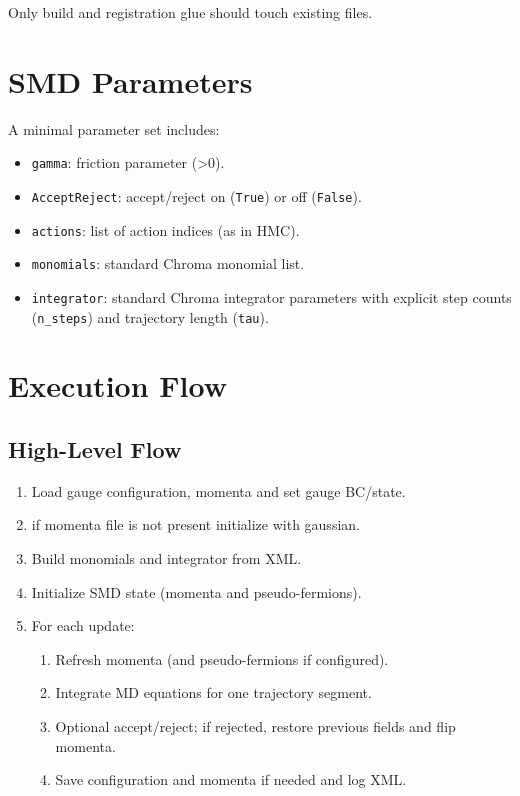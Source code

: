 \documentclass[11pt]{article}
\begin{document}
Only build and registration glue should touch existing files.

\section{SMD Parameters}
 A minimal parameter set includes:
\begin{itemize}[leftmargin=*]
  \item \texttt{gamma}: friction parameter (>0).
  \item \texttt{AcceptReject}: accept/reject on (\texttt{True}) or off (\texttt{False}).
  \item \texttt{actions}: list of action indices (as in HMC).
  \item \texttt{monomials}: standard Chroma monomial list.
  \item \texttt{integrator}: standard Chroma integrator parameters with explicit
        step counts (\texttt{n\_steps}) and trajectory length (\texttt{tau}).
\end{itemize}

\section{Execution Flow}
\subsection{High-Level Flow}
\begin{enumerate}
  \item Load gauge configuration, momenta and set gauge BC/state.
  	\item if momenta file is not present initialize with gaussian.
  \item Build monomials and integrator from XML.
  \item Initialize SMD state (momenta and pseudo-fermions).
  \item For each update:
    \begin{enumerate}
      \item Refresh momenta (and pseudo-fermions if configured).
      \item Integrate MD equations for one trajectory segment.
      \item Optional accept/reject; if rejected, restore previous fields and flip momenta.
      \item Save configuration and  momenta if needed and log XML.
    \end{enumerate}
\end{enumerate}
\end{document}
